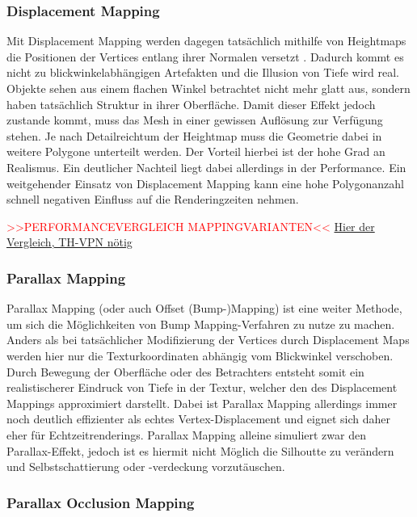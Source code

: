 \subsubsection{Displacement Mapping}
Mit Displacement Mapping werden dagegen tatsächlich mithilfe von Heightmaps die Positionen
der Vertices entlang ihrer Normalen versetzt \parencite{Cook1984,Cook1987}. Dadurch kommt es nicht zu blickwinkelabhängigen Artefakten
und die Illusion von Tiefe wird real. Objekte sehen aus einem flachen Winkel betrachtet nicht mehr
glatt aus, sondern haben tatsächlich Struktur in ihrer Oberfläche. Damit dieser Effekt jedoch zustande kommt,
muss das Mesh in einer gewissen Auflösung zur Verfügung stehen. Je nach Detailreichtum der Heightmap
muss die Geometrie dabei in weitere Polygone unterteilt werden. Der Vorteil hierbei ist der hohe
Grad an Realismus. Ein deutlicher Nachteil liegt dabei allerdings in der Performance.
Ein weitgehender Einsatz von Displacement Mapping kann eine hohe Polygonanzahl schnell
negativen Einfluss auf die Renderingzeiten nehmen. 

\textcolor{red}{>>PERFORMANCEVERGLEICH MAPPINGVARIANTEN<<}
\href{https://onlinelibrary.wiley.com/doi/abs/10.1111/cgf.13656}{Hier der Vergleich, TH-VPN nötig}

\subsubsection{Parallax Mapping}

Parallax Mapping (oder auch Offset (Bump-)Mapping) ist eine weiter Methode, um sich die Möglichkeiten von
Bump Mapping-Verfahren zu nutze zu machen. Anders als bei tatsächlicher Modifizierung der Vertices
durch Displacement Maps werden hier nur die Texturkoordinaten abhängig vom Blickwinkel verschoben. \parencite{Kaneko2001, Welsh2004}
Durch Bewegung der Oberfläche oder des Betrachters entsteht somit ein realistischerer Eindruck
von Tiefe in der Textur, welcher den des Displacement Mappings approximiert darstellt.
Dabei ist Parallax Mapping allerdings immer noch deutlich effizienter als echtes Vertex-Displacement
und eignet sich daher eher für Echtzeitrenderings.
Parallax Mapping alleine simuliert zwar den Parallax-Effekt, jedoch ist es hiermit nicht Möglich die Silhoutte zu verändern und
Selbstschattierung oder -verdeckung vorzutäuschen.


\subsubsection{Parallax Occlusion Mapping}
\label{sec:3.3.4}

